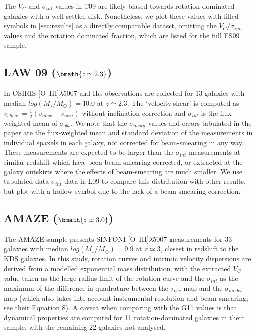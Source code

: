 \documentclass[fleqn,usenatbib]{mnras}
\begin{document}
The $V_{C}$ and $\sigma_{int}$ values in C09 are likely biased towards rotation-dominated galaxies with a well-settled disk.
Nonetheless, we plot these values with filled symbols in \cref{sec:results} as a directly comparable dataset, omitting the $V_{C}/\sigma_{int}$ values and the rotation dominated fraction, which are listed for the full FS09 sample.

\subsection{LAW 09 ($\bmath{z\simeq2.3}$)}\label{subsec:law_09}
In \cite[L09]{Law2009} OSIRIS [O~{\sc III}]$\lambda$5007 and H$\alpha$ observations are collected for 13 galaxies with median $log(M_{\star}/M_{\odot})=10.0$ at $z\simeq2.3$.
The `velocity shear' is computed as $v_{shear} = \frac{1}{2}(v_{max} - v_{min})$ without inclination correction and $\sigma_{int}$ is the flux-weighted mean of $\sigma_{obs}$.
We note that the $\sigma_{mean}$ values and errors tabulated in the \cite{Law2009} paper are the flux-weighted mean and standard deviation of the measurements in individual spaxels in each galaxy, not corrected for beam-smearing in any way.
These measurements are expected to be larger than the $\sigma_{int}$ measurements at similar redshift which have been beam-smearing corrected, or extracted at the galaxy outskirts where the effects of beam-smearing are much smaller.
We use tabulated data $\sigma_{int}$ data in L09 to compare this distribution with other results, but plot with a hollow symbol due to the lack of a beam-smearing correction.

\subsection{AMAZE ($\bmath{z\simeq3.0}$)}\label{subsec:AMAZE}
The AMAZE sample \cite[G11]{Gnerucci2011} presents SINFONI [O~{\sc III}]$\lambda$5007 measurements for 33 galaxies with median $log(M_{\star}/M_{\odot})=9.9$ at $z\simeq3$, closest in redshift to the KDS galaxies.
In this study, rotation curves and intrinsic velocity dispersions are derived from a modelled exponential mass distribution, with the extracted $V_{C}$ value taken as the large radius limit of the rotation curve and the $\sigma_{int}$ as the maximum of the difference in quadrature between the $\sigma_{obs}$ map and the $\sigma_{model}$ map (which also takes into account instrumental resolution and beam-smearing; see their Equation 8).
A caveat when comparing with the G11 values is that dynamical properties are computed for 11 rotation-dominated galaxies in their sample, with the remaining 22 galaxies not analysed. \\
\end{document}
